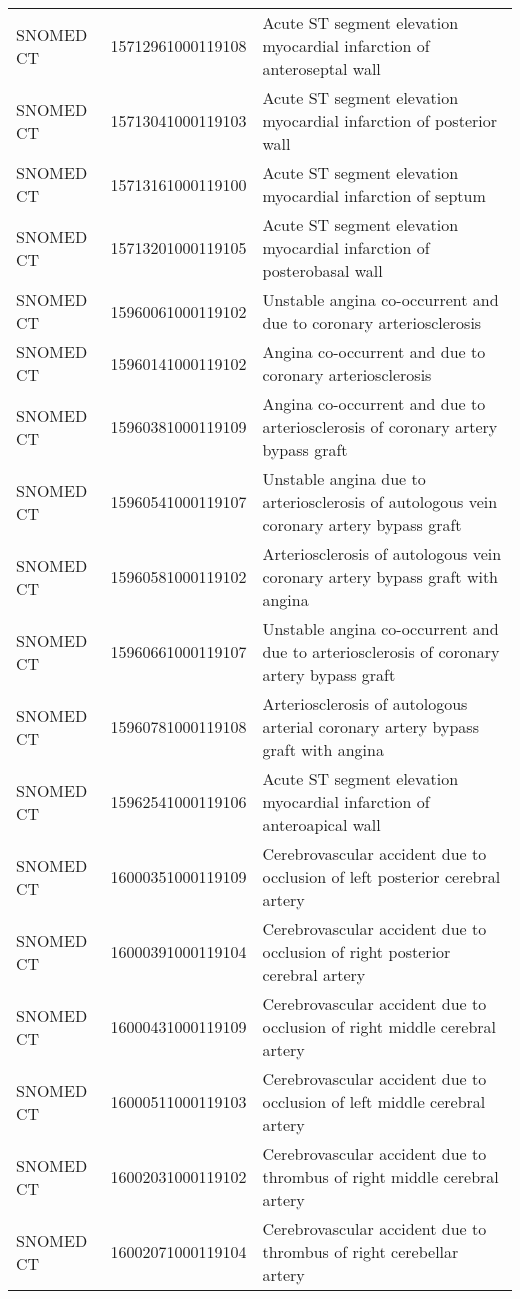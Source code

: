 \begin{longtable}{p{}p{}p{}}
  SNOMED CT & 15712961000119108 & Acute ST segment elevation myocardial infarction of anteroseptal wall \\ 
  SNOMED CT & 15713041000119103 & Acute ST segment elevation myocardial infarction of posterior wall \\ 
  SNOMED CT & 15713161000119100 & Acute ST segment elevation myocardial infarction of septum \\ 
  SNOMED CT & 15713201000119105 & Acute ST segment elevation myocardial infarction of posterobasal wall \\ 
  SNOMED CT & 15960061000119102 & Unstable angina co-occurrent and due to coronary arteriosclerosis \\ 
  SNOMED CT & 15960141000119102 & Angina co-occurrent and due to coronary arteriosclerosis \\ 
  SNOMED CT & 15960381000119109 & Angina co-occurrent and due to arteriosclerosis of coronary artery bypass graft \\ 
  SNOMED CT & 15960541000119107 & Unstable angina due to arteriosclerosis of autologous vein coronary artery bypass graft \\ 
  SNOMED CT & 15960581000119102 & Arteriosclerosis of autologous vein coronary artery bypass graft with angina \\ 
  SNOMED CT & 15960661000119107 & Unstable angina co-occurrent and due to arteriosclerosis of coronary artery bypass graft \\ 
  SNOMED CT & 15960781000119108 & Arteriosclerosis of autologous arterial coronary artery bypass graft with angina \\ 
  SNOMED CT & 15962541000119106 & Acute ST segment elevation myocardial infarction of anteroapical wall \\ 
  SNOMED CT & 16000351000119109 & Cerebrovascular accident due to occlusion of left posterior cerebral artery \\ 
  SNOMED CT & 16000391000119104 & Cerebrovascular accident due to occlusion of right posterior cerebral artery \\ 
  SNOMED CT & 16000431000119109 & Cerebrovascular accident due to occlusion of right middle cerebral artery \\ 
  SNOMED CT & 16000511000119103 & Cerebrovascular accident due to occlusion of left middle cerebral artery \\ 
  SNOMED CT & 16002031000119102 & Cerebrovascular accident due to thrombus of right middle cerebral artery \\ 
  SNOMED CT & 16002071000119104 & Cerebrovascular accident due to thrombus of right cerebellar artery \\ 

\end{longtable}

